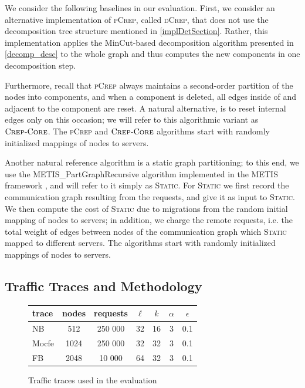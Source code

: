\documentclass[a4paper,UKenglish,cleveref, autoref, thm-restate,authorcolumns]{lipics-v2019}
\newcommand{\adjDel}{\textsc{pCrep}}
\newcommand{\static}{\textsc{Static}}
\newcommand{\directDecomp}{\textsc{dCrep}}
\newcommand{\coreDel}{\text{C{\scriptsize REP}-C{\scriptsize ORE}}}
\newcommand{\fb}{FB}
\newcommand{\dbmocfe}{Mocfe}
\newcommand{\dbnekbone}{NB}
\begin{document}
We consider the following baselines in our evaluation.
First, we consider an alternative implementation 
of \adjDel{}, called \directDecomp{}, that does not use the decomposition tree 
	structure mentioned in \cref{implDetSection}.
	Rather, this implementation 
	applies the MinCut-based decomposition algorithm presented in \cref{decomp_desc}
	to the whole graph and thus computes the new components in one decomposition step.

Furthermore, recall that \adjDel{} always maintains a second-order partition of the nodes 
into components, and when a component is deleted, all edges inside of and adjacent to the component are reset. 
A natural alternative, is to reset internal edges only on this occasion;
we will refer to this algorithmic variant as $\coreDel$.
The \adjDel{} and $\coreDel$ 
algorithms start with randomly initialized mappings of nodes to servers.

Another natural reference algorithm is a static graph partitioning;
to this end, we use the METIS\_PartGraphRecursive algorithm 
implemented in the METIS framework \cite{Karypis1998, Karypis1998a},
and will refer to it simply as \static{}. %
For \static{} we first record the communication graph resulting
from the requests, and give it as input to \static{}. 
We then compute the cost of \static{} due to migrations from the random initial mapping of nodes to servers; in addition, we charge 
the remote requests, i.e. the total weight of edges between nodes of the communication graph which \static{} mapped to different servers.
The algorithms start with randomly initialized mappings of nodes to servers.

\subsection{Traffic Traces and Methodology}
\label{inputDesc}

\begin{figure}
	\begin{center}
		\begin{tabular}{|l|c|c|c|c|c|c|}
			\hline
			trace & nodes & requests & $\ell$ & $k$ & $\alpha$ & $\epsilon$\\
			\hline
			\dbnekbone{} & 512 & 250 000 & 32 & 16 & 3 & 0.1 \\
			\dbmocfe{} & 1024 & 250 000 & 32 & 32 & 3 & 0.1 \\
			\fb{} & 2048 & 10 000 & 64 & 32 & 3 & 0.1 \\
			\hline
		\end{tabular}
	\end{center}
	\caption{Traffic traces used in the evaluation}
	\label{fig:trace_overview}
\end{figure}
\end{document}
